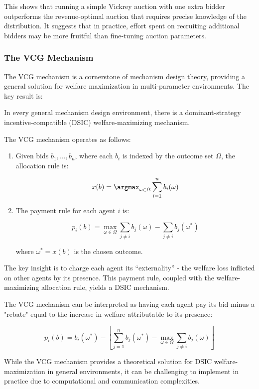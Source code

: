 \documentclass[
  letterpaper,
  DIV=11,
  numbers=noendperiod,
  oneside]{scrreprt}
\theoremstyle{remark}
\begin{document}
This shows that running a simple Vickrey auction with one extra bidder
outperforms the revenue-optimal auction that requires precise knowledge
of the distribution. It suggests that in practice, effort spent on
recruiting additional bidders may be more fruitful than fine-tuning
auction parameters.

\subsubsection*{The VCG Mechanism}\label{the-vcg-mechanism}

The VCG mechanism is a cornerstone of mechanism design theory, providing
a general solution for welfare maximization in multi-parameter
environments. The key result is:

\label{thm:VCG}{} In every general mechanism design
environment, there is a dominant-strategy incentive-compatible (DSIC)
welfare-maximizing mechanism.

The VCG mechanism operates as follows:

\begin{enumerate}
\def\labelenumi{\arabic{enumi}.}
\item
  Given bids \(b_1, \ldots, b_n\), where each \(b_i\) is indexed by the
  outcome set \(\Omega\), the allocation rule is:

  \[x(b) = \argmax_{\omega \in \Omega} \sum_{i=1}^n b_i(\omega)\]
\item
  The payment rule for each agent \(i\) is:

  \[p_i(b) = \max_{\omega \in \Omega} \sum_{j \neq i} b_j(\omega) - \sum_{j \neq i} b_j(\omega^*)\]

  where \(\omega^* = x(b)\) is the chosen outcome.
\end{enumerate}

The key insight is to charge each agent its ``externality'' - the
welfare loss inflicted on other agents by its presence. This payment
rule, coupled with the welfare-maximizing allocation rule, yields a DSIC
mechanism.

The VCG mechanism can be interpreted as having each agent pay its bid
minus a "rebate" equal to the increase in welfare attributable to its
presence:

\[p_i(b) = b_i(\omega^*) - \left[ \sum_{j=1}^n b_j(\omega^*) - \max_{\omega \in \Omega} \sum_{j \neq i} b_j(\omega) \right]\]

While the VCG mechanism provides a theoretical solution for DSIC
welfare-maximization in general environments, it can be challenging to
implement in practice due to computational and communication
complexities.
\end{document}
